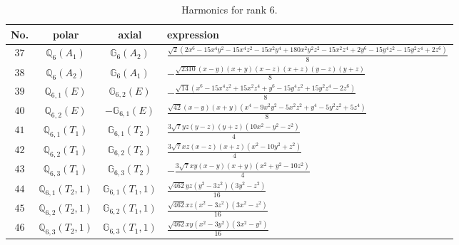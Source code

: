 \documentclass[fleqn,8pt,landscape]{jsarticle}
\begin{document}
\begin{table}[ht!]
\begin{center}
\caption{Harmonics for rank 6.}
\renewcommand{\arraystretch}{1.3}
\begin{tabular}{cccl} \hline \hline
No. & polar & axial & expression \\ \hline
$ 37 $ & $ \mathbb{Q}_{6}(A_{1}) $ & $ \mathbb{G}_{6}(A_{2}) $ & $ \frac{\sqrt{2} \left(2 x^{6} - 15 x^{4} y^{2} - 15 x^{4} z^{2} - 15 x^{2} y^{4} + 180 x^{2} y^{2} z^{2} - 15 x^{2} z^{4} + 2 y^{6} - 15 y^{4} z^{2} - 15 y^{2} z^{4} + 2 z^{6}\right)}{8} $ \\
$ 38 $ & $ \mathbb{Q}_{6}(A_{2}) $ & $ \mathbb{G}_{6}(A_{1}) $ & $ - \frac{\sqrt{2310} \left(x - y\right) \left(x + y\right) \left(x - z\right) \left(x + z\right) \left(y - z\right) \left(y + z\right)}{8} $ \\
$ 39 $ & $ \mathbb{Q}_{6,1}(E) $ & $ \mathbb{G}_{6,2}(E) $ & $ - \frac{\sqrt{14} \left(x^{6} - 15 x^{4} z^{2} + 15 x^{2} z^{4} + y^{6} - 15 y^{4} z^{2} + 15 y^{2} z^{4} - 2 z^{6}\right)}{8} $ \\
$ 40 $ & $ \mathbb{Q}_{6,2}(E) $ & $ -\mathbb{G}_{6,1}(E) $ & $ \frac{\sqrt{42} \left(x - y\right) \left(x + y\right) \left(x^{4} - 9 x^{2} y^{2} - 5 x^{2} z^{2} + y^{4} - 5 y^{2} z^{2} + 5 z^{4}\right)}{8} $ \\
$ 41 $ & $ \mathbb{Q}_{6,1}(T_{1}) $ & $ \mathbb{G}_{6,1}(T_{2}) $ & $ \frac{3 \sqrt{7} y z \left(y - z\right) \left(y + z\right) \left(10 x^{2} - y^{2} - z^{2}\right)}{4} $ \\
$ 42 $ & $ \mathbb{Q}_{6,2}(T_{1}) $ & $ \mathbb{G}_{6,2}(T_{2}) $ & $ \frac{3 \sqrt{7} x z \left(x - z\right) \left(x + z\right) \left(x^{2} - 10 y^{2} + z^{2}\right)}{4} $ \\
$ 43 $ & $ \mathbb{Q}_{6,3}(T_{1}) $ & $ \mathbb{G}_{6,3}(T_{2}) $ & $ - \frac{3 \sqrt{7} x y \left(x - y\right) \left(x + y\right) \left(x^{2} + y^{2} - 10 z^{2}\right)}{4} $ \\
$ 44 $ & $ \mathbb{Q}_{6,1}(T_{2},1) $ & $ \mathbb{G}_{6,1}(T_{1},1) $ & $ \frac{\sqrt{462} y z \left(y^{2} - 3 z^{2}\right) \left(3 y^{2} - z^{2}\right)}{16} $ \\
$ 45 $ & $ \mathbb{Q}_{6,2}(T_{2},1) $ & $ \mathbb{G}_{6,2}(T_{1},1) $ & $ \frac{\sqrt{462} x z \left(x^{2} - 3 z^{2}\right) \left(3 x^{2} - z^{2}\right)}{16} $ \\
$ 46 $ & $ \mathbb{Q}_{6,3}(T_{2},1) $ & $ \mathbb{G}_{6,3}(T_{1},1) $ & $ \frac{\sqrt{462} x y \left(x^{2} - 3 y^{2}\right) \left(3 x^{2} - y^{2}\right)}{16} $ \\

\end{tabular}
\end{center}
\end{table}
\end{document}
